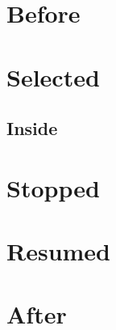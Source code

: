 \documentclass{article}
\begin{document}
\section{Before}
\startcontents[range]
\section{Selected}\localtableofcontents
\subsection{Inside}
\stopcontents[range]\section{Stopped}
\resumecontents[range]\section{Resumed}
\stopcontents[range]\section{After}
\end{document}
